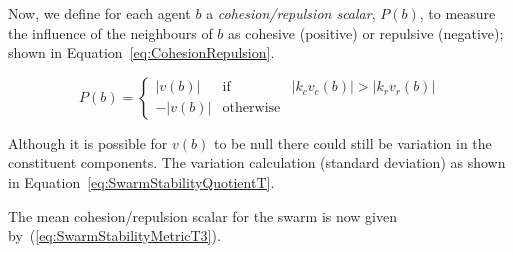 \documentclass{ieeeaccess}
\begin{document}

Now, we define for each agent $b$ a \textit{cohesion/repulsion scalar}, $P(b)$,
to measure the influence of the neighbours of $b$ as cohesive (positive) or
repulsive (negative); shown in Equation~\ref{eq:CohesionRepulsion}.

\begin{equation}
\label{eq:CohesionRepulsion}
P(b) = \left\{\begin{array}{lll}
               |v(b)|& \mathrm{if} & |k_cv_c(b)| > |k_r v_r(b)|\\
              -|v(b)|& \mathrm{otherwise}
              \end{array}\right.
\end{equation}

Although it is possible for $v(b)$ to be null there could still be variation in
the constituent components. The variation calculation (standard deviation) as
shown in Equation~\ref{eq:SwarmStabilityQuotientT}. 



The mean cohesion/repulsion scalar for the swarm is now given
by~(\ref{eq:SwarmStabilityMetricT3}).  
\end{document}

